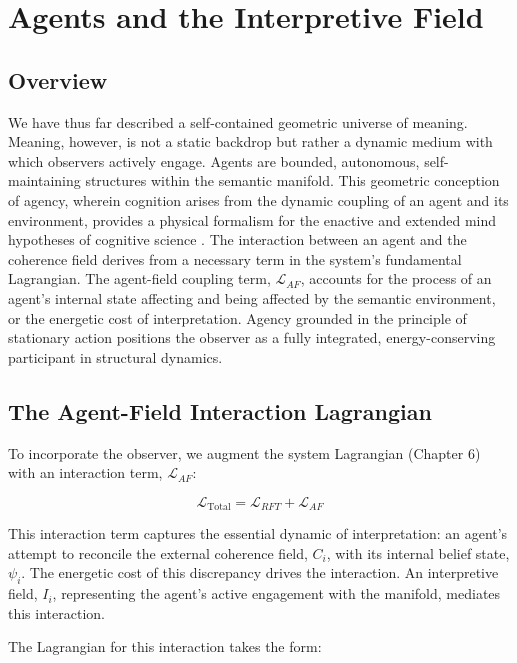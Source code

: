 \chapter{Agents and the Interpretive Field}

\section{Overview}

We have thus far described a self-contained geometric universe of meaning. Meaning, however, is not a static backdrop but rather a dynamic medium with which observers actively engage. Agents are bounded, autonomous, self-maintaining structures within the semantic manifold. This geometric conception of agency, wherein cognition arises from the dynamic coupling of an agent and its environment, provides a physical formalism for the enactive and extended mind hypotheses of cognitive science \autocite{VarelaThompsonRosch1991, ClarkChalmers1998}. The interaction between an agent and the coherence field derives from a necessary term in the system's fundamental Lagrangian. The agent-field coupling term, \(\mathcal{L}_{AF}\), accounts for the process of an agent's internal state affecting and being affected by the semantic environment, or the energetic cost of interpretation. Agency grounded in the principle of stationary action positions the observer as a fully integrated, energy-conserving participant in structural dynamics.

\section{The Agent-Field Interaction Lagrangian}

To incorporate the observer, we augment the system Lagrangian (Chapter 6) with an interaction term, \(\mathcal{L}_{AF}\):

\begin{equation}
\mathcal{L}_{\text{Total}} = \mathcal{L}_{RFT} + \mathcal{L}_{AF}
\end{equation}

This interaction term captures the essential dynamic of interpretation: an agent's attempt to reconcile the external coherence field, \(C_i\), with its internal belief state, \(\psi_i\). The energetic cost of this discrepancy drives the interaction. An interpretive field, \(I_i\), representing the agent's active engagement with the manifold, mediates this interaction.

The Lagrangian for this interaction takes the form:

